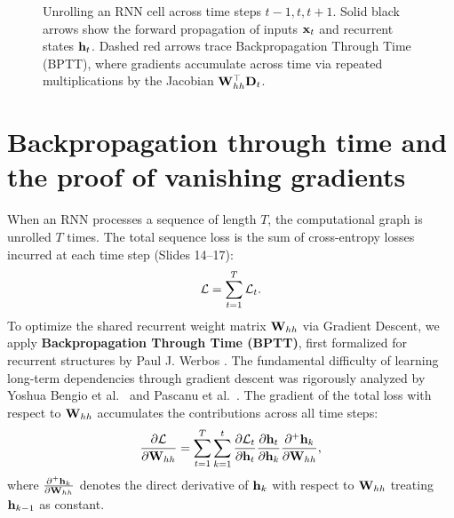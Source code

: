 \documentclass[../../main.tex]{subfiles}
\begin{document}
\begin{figure}[htbp]
{%
}
\caption{Unrolling an RNN cell across time steps $t-1, t, t+1$. Solid black arrows show the forward propagation of inputs $\mathbf{x}_t$ and recurrent states $\mathbf{h}_t$. Dashed red arrows trace Backpropagation Through Time (BPTT), where gradients accumulate across time via repeated multiplications by the Jacobian $\mathbf{W}_{hh}^\top \mathbf{D}_t$.}
\label{fig:unrolled_rnn}
\end{figure}

\section{Backpropagation through time and the proof of vanishing gradients}
\label{sec:bptt_proof}

When an RNN processes a sequence of length $T$, the computational graph is unrolled $T$ times. The total sequence loss is the sum of cross-entropy losses incurred at each time step (Slides 14--17):
\begin{equation}
\label{eq:total_rnn_loss}
\mathcal{L} = \sum_{t=1}^T \mathcal{L}_t.
\end{equation}
To optimize the shared recurrent weight matrix $\mathbf{W}_{hh}$ via Gradient Descent, we apply \textbf{Backpropagation Through Time (BPTT)}, first formalized for recurrent structures by Paul J. Werbos \cite{werbos1990}. The fundamental difficulty of learning long-term dependencies through gradient descent was rigorously analyzed by Yoshua Bengio et al.~\cite{bengio1994} and Pascanu et al.~\cite{pascanu2013difficulty}. The gradient of the total loss with respect to $\mathbf{W}_{hh}$ accumulates the contributions across all time steps:
\begin{equation}
\label{eq:bptt_grad_whh}
\frac{\partial \mathcal{L}}{\partial \mathbf{W}_{hh}} = \sum_{t=1}^T \sum_{k=1}^t \frac{\partial \mathcal{L}_t}{\partial \mathbf{h}_t} \frac{\partial \mathbf{h}_t}{\partial \mathbf{h}_k} \frac{\partial^+ \mathbf{h}_k}{\partial \mathbf{W}_{hh}},
\end{equation}
where $\frac{\partial^+ \mathbf{h}_k}{\partial \mathbf{W}_{hh}}$ denotes the direct derivative of $\mathbf{h}_k$ with respect to $\mathbf{W}_{hh}$ treating $\mathbf{h}_{k-1}$ as constant.
\end{document}
